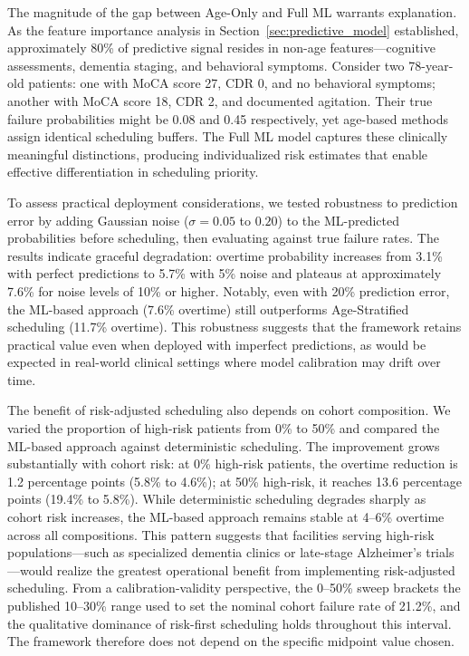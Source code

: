 \documentclass[11pt,a4paper]{article}
\begin{document}
The magnitude of the gap between Age-Only and Full ML warrants explanation. As the feature importance analysis in Section~\ref{sec:predictive_model} established, approximately 80\% of predictive signal resides in non-age features---cognitive assessments, dementia staging, and behavioral symptoms. Consider two 78-year-old patients: one with MoCA score 27, CDR 0, and no behavioral symptoms; another with MoCA score 18, CDR 2, and documented agitation. Their true failure probabilities might be 0.08 and 0.45 respectively, yet age-based methods assign identical scheduling buffers. The Full ML model captures these clinically meaningful distinctions, producing individualized risk estimates that enable effective differentiation in scheduling priority.

To assess practical deployment considerations, we tested robustness to prediction error by adding Gaussian noise ($\sigma = 0.05$ to $0.20$) to the ML-predicted probabilities before scheduling, then evaluating against true failure rates. The results indicate graceful degradation: overtime probability increases from 3.1\% with perfect predictions to 5.7\% with 5\% noise and plateaus at approximately 7.6\% for noise levels of 10\% or higher. Notably, even with 20\% prediction error, the ML-based approach (7.6\% overtime) still outperforms Age-Stratified scheduling (11.7\% overtime). This robustness suggests that the framework retains practical value even when deployed with imperfect predictions, as would be expected in real-world clinical settings where model calibration may drift over time.

The benefit of risk-adjusted scheduling also depends on cohort composition. We varied the proportion of high-risk patients from 0\% to 50\% and compared the ML-based approach against deterministic scheduling. The improvement grows substantially with cohort risk: at 0\% high-risk patients, the overtime reduction is 1.2 percentage points (5.8\% to 4.6\%); at 50\% high-risk, it reaches 13.6 percentage points (19.4\% to 5.8\%). While deterministic scheduling degrades sharply as cohort risk increases, the ML-based approach remains stable at 4--6\% overtime across all compositions. This pattern suggests that facilities serving high-risk populations---such as specialized dementia clinics or late-stage Alzheimer's trials---would realize the greatest operational benefit from implementing risk-adjusted scheduling. From a calibration-validity perspective, the 0--50\% sweep brackets the published 10--30\% range used to set the nominal cohort failure rate of 21.2\%, and the qualitative dominance of risk-first scheduling holds throughout this interval. The framework therefore does not depend on the specific midpoint value chosen.
\end{document}
